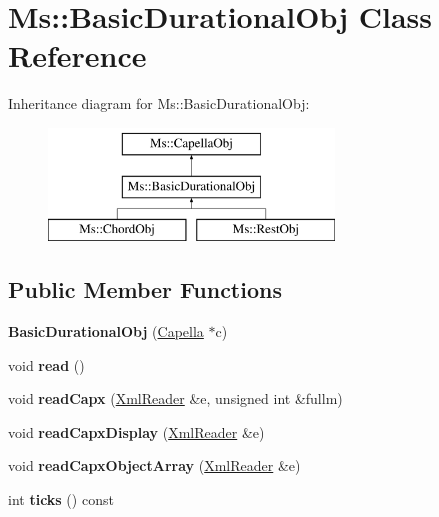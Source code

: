 \hypertarget{class_ms_1_1_basic_durational_obj}{}\section{Ms\+:\+:Basic\+Durational\+Obj Class Reference}
\label{class_ms_1_1_basic_durational_obj}
Inheritance diagram for Ms\+:\+:Basic\+Durational\+Obj\+:\begin{figure}[H]
\begin{center}
\leavevmode
\includegraphics[height=3.000000cm]{class_ms_1_1_basic_durational_obj}
\end{center}
\end{figure}
\subsection*{Public Member Functions}
\begin{DoxyCompactItemize}
\item 
\mbox{\label{class_ms_1_1_basic_durational_obj_a22e24da9bbe4447d5b5691de1dbc1d97}} 
{\bfseries Basic\+Durational\+Obj} (\hyperlink{class_ms_1_1_capella}{Capella} $\ast$c)
\item 
\mbox{\label{class_ms_1_1_basic_durational_obj_a262609cc8457a59a02af4c89f2587966}} 
void {\bfseries read} ()
\item 
\mbox{\label{class_ms_1_1_basic_durational_obj_ab6c5dc5d83f3c6a622a3ba26c7528abe}} 
void {\bfseries read\+Capx} (\hyperlink{class_ms_1_1_xml_reader}{Xml\+Reader} \&e, unsigned int \&fullm)
\item 
\mbox{\label{class_ms_1_1_basic_durational_obj_a50e9610424589d6d9d98f8ffcbe53fa7}} 
void {\bfseries read\+Capx\+Display} (\hyperlink{class_ms_1_1_xml_reader}{Xml\+Reader} \&e)
\item 
\mbox{\label{class_ms_1_1_basic_durational_obj_a419af898db9d6822e8277880f13cface}} 
void {\bfseries read\+Capx\+Object\+Array} (\hyperlink{class_ms_1_1_xml_reader}{Xml\+Reader} \&e)
\item 
\mbox{\label{class_ms_1_1_basic_durational_obj_acc2d719656b1b9b9c3c33f021af6aa1a}} 
int {\bfseries ticks} () const
\end{DoxyCompactItemize}
